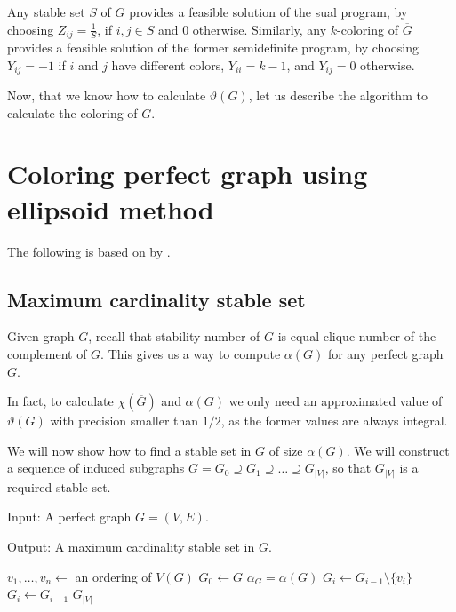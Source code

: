 Any stable set $S$ of $G$ provides a feasible solution of the sual program, by choosing $Z_{ij} = \frac{1}{S}$, if $i, j \in S$ and 0 otherwise. Similarly, any $k$-coloring of $\overline{G}$ provides a feasible solution of the former semidefinite program, by choosing $Y_{ij} = -1$ if $i$ and $j$ have different colors, $Y_{ii} = k-1$, and $Y_{ij} = 0$ otherwise.

Now, that we know how to calculate $\vartheta(G)$, let us describe the algorithm to calculate the coloring of $G$.

\section{Coloring perfect graph using ellipsoid method}
\label{sec:coloringEllipsoid}
The following is based on  by \citeauthor{Laurent2005} \cite{Laurent2005}.

\subsection{Maximum cardinality stable set}

Given graph $G$, recall that stability number of $G$ is equal clique number of the complement of $G$. This gives us a way to compute $\alpha(G)$ for any perfect graph $G$.

In fact, to calculate $\chi(\overline{G})$ and $\alpha(G)$ we only need an approximated value of $\vartheta(G)$ with precision smaller than $1/2$, as the former values are always integral.

We will now show how to find a stable set in $G$ of size $\alpha(G)$. We will construct a sequence of induced subgraphs $G = G_0 \supseteq G_1 \supseteq \ldots \supseteq G_{|V|}$, so that $G_{|V|}$ is a required stable set.

\begin{alg}
  \label{alg:maxStableSet}
  Input: A perfect graph $G = (V, E)$.

  \noindent Output: A maximum cardinality stable set in $G$.
\end{alg}

\begin{algorithmic}[1]
  \ls $v_1, \ldots, v_n \gets$ an ordering of $V(G)$
  \ls $G_0 \leftarrow G$
  \ls $\alpha_G = \alpha(G)$
      \ls $G_i \leftarrow G_{i-1} \setminus \{v_i\}$
    \mElse
      \ls $G_i \leftarrow G_{i-1}$
    \mEndIf
  \mEndFor
  \ls \RETURN $G_{|V|}$
  \mEndProcedure
\end{algorithmic}

